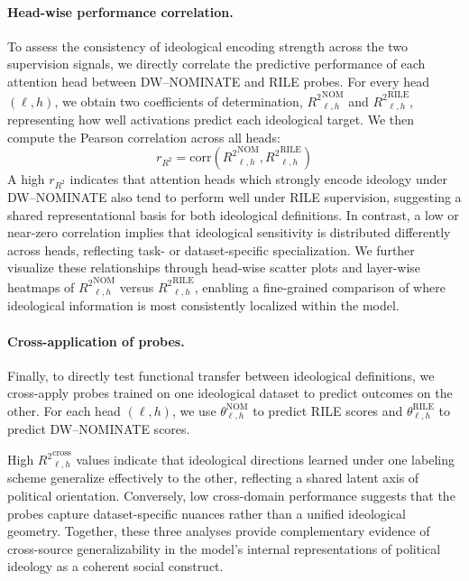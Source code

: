 \documentclass[11pt]{article}
\begin{document}
\paragraph{Head-wise performance correlation.}
To assess the consistency of ideological encoding strength across the two supervision signals, we directly correlate the predictive performance of each attention head between DW--NOMINATE and RILE probes. For every head $(\ell,h)$, we obtain two coefficients of determination, ${R^2}_{\ell,h}^{\text{NOM}}$ and ${R^2}_{\ell,h}^{\text{RILE}}$, representing how well activations predict each ideological target. We then compute the Pearson correlation across all heads:
\begin{equation*}
    r_{R^2} = \mathrm{corr}\!\left({R^2}_{\ell,h}^{\text{NOM}}, {R^2}_{\ell,h}^{\text{RILE}}\right)
\end{equation*}
A high $r_{R^2}$ indicates that attention heads which strongly encode ideology under DW--NOMINATE also tend to perform well under RILE supervision, suggesting a shared representational basis for both ideological definitions. In contrast, a low or near-zero correlation implies that ideological sensitivity is distributed differently across heads, reflecting task- or dataset-specific specialization. We further visualize these relationships through head-wise scatter plots and layer-wise heatmaps of ${R^2}_{\ell,h}^{\text{NOM}}$ versus ${R^2}_{\ell,h}^{\text{RILE}}$, enabling a fine-grained comparison of where ideological information is most consistently localized within the model.

\paragraph{Cross-application of probes.}
Finally, to directly test functional transfer between ideological definitions, we cross-apply probes trained on one ideological dataset to predict outcomes on the other. For each head $(\ell,h)$, we use $\theta_{\ell,h}^{\text{NOM}}$ to predict RILE scores and $\theta_{\ell,h}^{\text{RILE}}$ to predict DW--NOMINATE scores.

High ${R^2}_{\ell,h}^{\text{cross}}$ values indicate that ideological directions learned under one labeling scheme generalize effectively to the other, reflecting a shared latent axis of political orientation. Conversely, low cross-domain performance suggests that the probes capture dataset-specific nuances rather than a unified ideological geometry. Together, these three analyses provide complementary evidence of cross-source generalizability in the model’s internal representations of political ideology as a coherent social construct.
\end{document}
